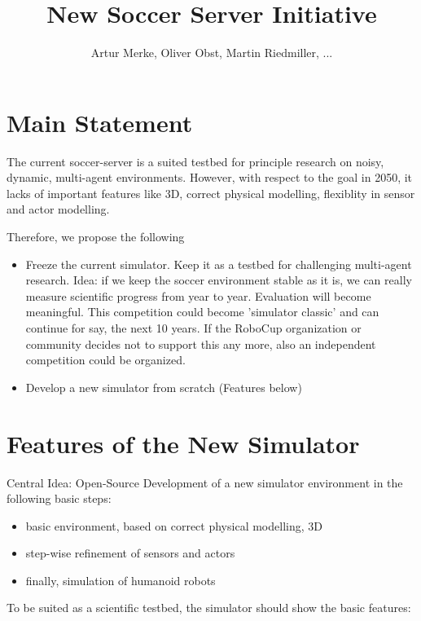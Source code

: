 \documentclass[a4paper,12pt]{article}
\begin{document}
\title{New Soccer Server Initiative}
\author{Artur Merke, Oliver Obst, Martin Riedmiller, ...}

\maketitle

\section{Main Statement}

The current soccer-server is a suited testbed for principle research
on noisy, dynamic, multi-agent environments. However, with respect to
the goal in 2050, it lacks of important features like 3D, correct
physical modelling, flexiblity in sensor and actor modelling.

Therefore, we propose the following

\begin{itemize}
\item Freeze the current simulator. Keep it as a testbed for
  challenging multi-agent research.  Idea: if we keep the soccer
  environment stable as it is, we can really measure scientific
  progress from year to year. Evaluation will become meaningful.  This
  competition could become 'simulator classic' and can continue for
  say, the next 10 years.  If the RoboCup organization or community
  decides not to support this any more, also an independent
  competition could be organized.
\item Develop a new simulator from scratch (Features below)
\end{itemize}

\section{Features of the New Simulator}

Central Idea: Open-Source Development of a new simulator environment
in the following basic steps:

\begin{itemize}
\item basic environment, based on correct physical modelling, 3D
\item step-wise refinement of sensors and actors
\item finally, simulation of  humanoid robots
\end{itemize}

To be suited as a scientific testbed, the simulator should show the basic features:
\end{document}
